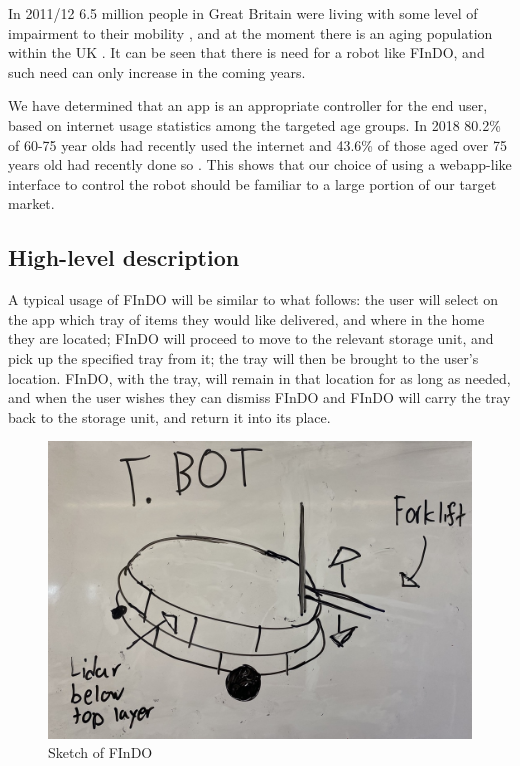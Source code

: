 \documentclass{article}
\begin{document}
In 2011/12 6.5 million people in Great Britain were living with some level of impairment to their mobility \cite{disabilitystats}, and at the moment there is an aging population within the UK \cite{agegrowth}. It can be seen that there is need for a robot like FInDO, and such need can only increase in the coming years. 

We have determined that an app is an appropriate controller for the end user, based on internet usage statistics among the targeted age groups. In 2018 80.2\% of 60-75 year olds had recently used the internet and 43.6\% of those aged over 75 years old had recently done so \cite{webage}. This shows that our choice of using a webapp-like interface to control the robot should be familiar to a large portion of our target market. 

\subsection{High-level description} 
A typical usage of FInDO will be similar to what follows: the user will select on the app which tray of items they would like delivered, and where in the home they are located; 
FInDO will proceed to move to the relevant storage unit, and pick up the specified tray from it; the tray will then be brought to the user's location. 
FInDO, with the tray, will remain in that location for as long as needed, and when the user wishes they can dismiss FInDO and FInDO will carry the tray back to the storage unit, and return it into its place.

\begin{figure}[tb]
\vskip 3mm
\begin{center}
\begin{small}
\begin{sc}
\centerline{\includegraphics[width=0.5\columnwidth]{figs/tbot.jpeg}}
\caption{Sketch of FInDO}
\label{Front view}
\end{sc}
\end{small}
\end{center}
\vskip -3mm
\end{figure} 
\end{document}
